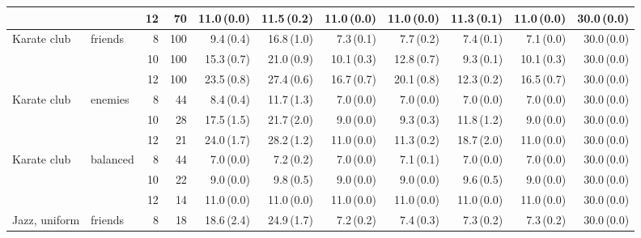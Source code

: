 \begin{table}[p]
{\begin{tabular}{llrrrrrrrrr}
 &  & 12 & 70 & 11.0\,{\scriptsize(0.0)} & 11.5\,{\scriptsize(0.2)} & 11.0\,{\scriptsize(0.0)} & 11.0\,{\scriptsize(0.0)} & 11.3\,{\scriptsize(0.1)} & 11.0\,{\scriptsize(0.0)} & 30.0\,{\scriptsize(0.0)} \\
\midrule
Karate club & friends & 8 & 100 & 9.4\,{\scriptsize(0.4)} & 16.8\,{\scriptsize(1.0)} & 7.3\,{\scriptsize(0.1)} & 7.7\,{\scriptsize(0.2)} & 7.4\,{\scriptsize(0.1)} & 7.1\,{\scriptsize(0.0)} & 30.0\,{\scriptsize(0.0)} \\
 &  & 10 & 100 & 15.3\,{\scriptsize(0.7)} & 21.0\,{\scriptsize(0.9)} & 10.1\,{\scriptsize(0.3)} & 12.8\,{\scriptsize(0.7)} & 9.3\,{\scriptsize(0.1)} & 10.1\,{\scriptsize(0.3)} & 30.0\,{\scriptsize(0.0)} \\
 &  & 12 & 100 & 23.5\,{\scriptsize(0.8)} & 27.4\,{\scriptsize(0.6)} & 16.7\,{\scriptsize(0.7)} & 20.1\,{\scriptsize(0.8)} & 12.3\,{\scriptsize(0.2)} & 16.5\,{\scriptsize(0.7)} & 30.0\,{\scriptsize(0.0)} \\
\addlinespace[1pt]
Karate club & enemies & 8 & 44 & 8.4\,{\scriptsize(0.4)} & 11.7\,{\scriptsize(1.3)} & 7.0\,{\scriptsize(0.0)} & 7.0\,{\scriptsize(0.0)} & 7.0\,{\scriptsize(0.0)} & 7.0\,{\scriptsize(0.0)} & 30.0\,{\scriptsize(0.0)} \\
 &  & 10 & 28 & 17.5\,{\scriptsize(1.5)} & 21.7\,{\scriptsize(2.0)} & 9.0\,{\scriptsize(0.0)} & 9.3\,{\scriptsize(0.3)} & 11.8\,{\scriptsize(1.2)} & 9.0\,{\scriptsize(0.0)} & 30.0\,{\scriptsize(0.0)} \\
 &  & 12 & 21 & 24.0\,{\scriptsize(1.7)} & 28.2\,{\scriptsize(1.2)} & 11.0\,{\scriptsize(0.0)} & 11.3\,{\scriptsize(0.2)} & 18.7\,{\scriptsize(2.0)} & 11.0\,{\scriptsize(0.0)} & 30.0\,{\scriptsize(0.0)} \\
\addlinespace[1pt]
Karate club & balanced & 8 & 44 & 7.0\,{\scriptsize(0.0)} & 7.2\,{\scriptsize(0.2)} & 7.0\,{\scriptsize(0.0)} & 7.1\,{\scriptsize(0.1)} & 7.0\,{\scriptsize(0.0)} & 7.0\,{\scriptsize(0.0)} & 30.0\,{\scriptsize(0.0)} \\
 &  & 10 & 22 & 9.0\,{\scriptsize(0.0)} & 9.8\,{\scriptsize(0.5)} & 9.0\,{\scriptsize(0.0)} & 9.0\,{\scriptsize(0.0)} & 9.6\,{\scriptsize(0.5)} & 9.0\,{\scriptsize(0.0)} & 30.0\,{\scriptsize(0.0)} \\
 &  & 12 & 14 & 11.0\,{\scriptsize(0.0)} & 11.0\,{\scriptsize(0.0)} & 11.0\,{\scriptsize(0.0)} & 11.0\,{\scriptsize(0.0)} & 11.0\,{\scriptsize(0.0)} & 11.0\,{\scriptsize(0.0)} & 30.0\,{\scriptsize(0.0)} \\
\midrule
Jazz, uniform & friends & 8 & 18 & 18.6\,{\scriptsize(2.4)} & 24.9\,{\scriptsize(1.7)} & 7.2\,{\scriptsize(0.2)} & 7.4\,{\scriptsize(0.3)} & 7.3\,{\scriptsize(0.2)} & 7.3\,{\scriptsize(0.2)} & 30.0\,{\scriptsize(0.0)} \\

\end{tabular}}
\end{table}
